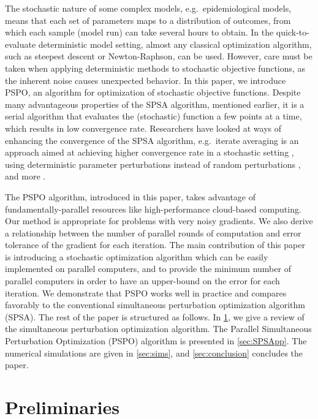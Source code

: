 The stochastic nature of some complex models, e.g.\, epidemiological models, means that each set of parameters maps to a distribution of outcomes, from which each sample (model run) can take several hours to obtain. In the quick-to-evaluate deterministic model setting, almost any classical optimization algorithm, such as steepest descent or Newton-Raphson, can be used. However, care must be taken when applying deterministic methods to stochastic objective functions, as the inherent noise causes unexpected behavior. In this paper, we introduce PSPO, an algorithm for optimization of stochastic objective functions. Despite many advantageous properties of the SPSA algorithm, mentioned earlier, it is a serial algorithm that evaluates the (stochastic) function a few points at a time, which results in low convergence rate. Researchers have looked at ways of enhancing the convergence of the SPSA algorithm, e.g.\, iterate averaging is an approach aimed at achieving higher convergence rate in a stochastic setting \cite{polyak1992acceleration}, using deterministic parameter perturbations instead of random perturbations \cite{bhatnagar2003two}, and more \cite{kocsis2006universal,spall2009feedback}.


The PSPO algorithm, introduced in this paper, takes advantage of fundamentally-parallel resources like high-performance cloud-based computing. Our method is appropriate for problems with very noisy gradients. We also derive a relationship between the number of parallel rounds of computation and error tolerance of the gradient for each iteration. The main contribution of this paper is introducing a stochastic optimization algorithm which can be easily implemented on parallel computers, and to provide the minimum number of parallel computers in order to have an upper-bound on the error for each iteration. We demonstrate that PSPO works well in practice and compares favorably to the conventional simultaneous perturbation optimization algorithm (SPSA). The rest of the paper is structured as follows. In \cref{sec:prelim}, we give a review of the simultaneous perturbation optimization algorithm. The Parallel Simultaneous Perturbation Optimization (PSPO) algorithm is presented in \cref{sec:SPSApp}. The numerical simulations are given in \cref{sec:sims}, and \cref{sec:conclusion} concludes the paper.



\section{Preliminaries} \label{sec:prelim}

